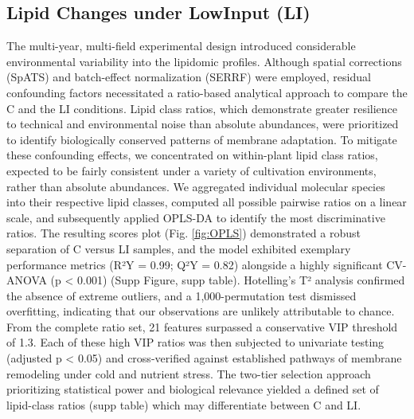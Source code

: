 \documentclass[10pt,letterpaper]{article}
\begin{document}
\subsection*{Lipid Changes under LowInput (LI)}
The multi-year, multi-field experimental design introduced considerable environmental variability into the lipidomic profiles. Although spatial corrections (SpATS) and batch-effect normalization (SERRF) were employed, residual confounding factors necessitated a ratio-based analytical approach to compare the C and the LI conditions. Lipid class ratios, which demonstrate greater resilience to technical and environmental noise than absolute abundances, were prioritized to identify biologically conserved patterns of membrane adaptation. To mitigate these confounding effects, we concentrated on within-plant lipid class ratios, expected to be fairly consistent under a variety of cultivation environments, rather than absolute abundances. We aggregated individual molecular species into their respective lipid classes, computed all possible pairwise ratios on a linear scale, and subsequently applied OPLS-DA to identify the most discriminative ratios. The resulting scores plot (Fig. \ref{fig:OPLS}) demonstrated a robust separation of C versus LI samples, and the model exhibited exemplary performance metrics (R²Y = 0.99; Q²Y = 0.82) alongside a highly significant CV-ANOVA (p < 0.001) (Supp Figure, supp table). Hotelling’s T² analysis confirmed the absence of extreme outliers, and a 1,000-permutation test dismissed overfitting, indicating that our observations are unlikely attributable to chance. From the complete ratio set, 21 features surpassed a conservative VIP threshold of 1.3. Each of these high VIP ratios was then subjected to univariate testing (adjusted p < 0.05) and cross-verified against established pathways of membrane remodeling under cold and nutrient stress. The two-tier selection approach prioritizing statistical power and biological relevance yielded a defined set of lipid-class ratios (supp table) which may differentiate between C and LI.
\end{document}

